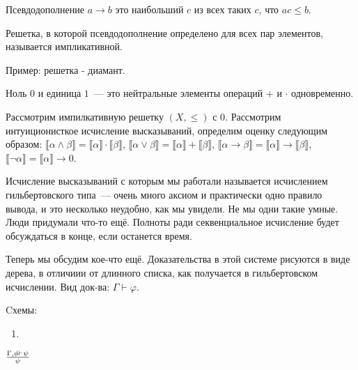 \begin{definition}
    Псевдодополнение $a\to b$ это наибольший $c$ из всех таких $c$, что $ac \leqslant b$.

    Решетка, в которой псевдодополнение определено для всех пар элементов, называется импликативной.
\end{definition}

Пример: решетка - диамант.

\begin{definition}
Ноль $0$ и единица $1$~--- это нейтральные элементы операций $+$ и $\cdot$ одновременно.     
\end{definition}

\begin{theorem}
    Рассмотрим импилкативную решетку $(X, \leqslant)$ с 0.
    Рассмотрим интуиционисткое исчисление высказываний, определим оценку следующим образом: 
    $\llbracket \alpha \land \beta \rrbracket = \llbracket \alpha \rrbracket \cdot \llbracket \beta \rrbracket$, $\llbracket \alpha \lor \beta \rrbracket = \llbracket \alpha \rrbracket + \llbracket \beta \rrbracket$, $\llbracket \alpha \to \beta \rrbracket = \llbracket \alpha \rrbracket \to \llbracket \beta \rrbracket$, $\llbracket \neg \alpha \rrbracket = \llbracket \alpha \rrbracket \to 0$.
\end{theorem}

Исчисление высказываний с которым мы работали называется исчислением  гильбертовского типа~--- очень много аксиом и практически одно правило вывода, и это несколько неудобно, как мы увидели.
Не мы одни такие умные. 
Люди придумали что-то ещё.
Полноты ради секвенциальное исчисление будет обсуждаться в конце, если останется время.

Теперь мы обсудим кое-что ещё.
Доказательства в этой системе рисуются в виде дерева, в отличиии от длинного списка, как получается в гильбертовском исчислении.
Вид док-ва: $\Gamma \vdash \varphi$.

Cхемы:
\begin{enumerate}
    \item $\over$ 
\end{enumerate}

$\Gamma, \phi \vdash \psi \over \psi$
\endinput